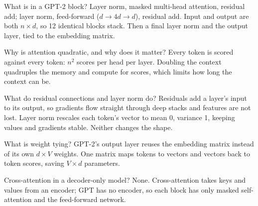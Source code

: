 \begin{iq}[\core]{What is in a GPT-2 block?}
Layer norm, masked multi-head attention, residual add; layer norm, feed-forward ($d \to 4d \to d$), residual add. Input and output are both $n \times d$, so 12 identical blocks stack. Then a final layer norm and the output layer, tied to the embedding matrix.
\end{iq}

\begin{iq}{Why is attention quadratic, and why does it matter?}
Every token is scored against every token: $n^2$ scores per head per layer. Doubling the context quadruples the memory and compute for scores, which limits how long the context can be.
\end{iq}

\begin{iq}{What do residual connections and layer norm do?}
Residuals add a layer's input to its output, so gradients flow straight through deep stacks and features are not lost. Layer norm rescales each token's vector to mean 0, variance 1, keeping values and gradients stable. Neither changes the shape.
\end{iq}

\begin{iq}{What is weight tying?}
GPT-2's output layer reuses the embedding matrix instead of its own $d \times V$ weights. One matrix maps tokens to vectors and vectors back to token scores, saving $V \times d$ parameters.
\end{iq}

\begin{iq}{Cross-attention in a decoder-only model?}
None. Cross-attention takes keys and values from an encoder; GPT has no encoder, so each block has only masked self-attention and the feed-forward network.
\end{iq}
